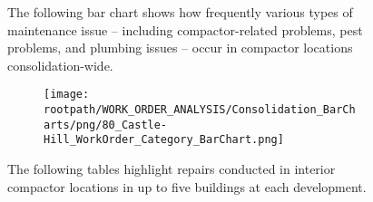 \begin{figure}[h]
                                \sf
                                The following bar chart shows how frequently various types of maintenance issue -- including compactor-related problems, pest problems, and plumbing issues -- occur in compactor locations consolidation-wide.
                                \raggedright
                                \begin{subfigure}{\textwidth}
                                \texttt{[image: \\rootpath/WORK\_ORDER\_ANALYSIS/Consolidation\_BarCharts/png/80\_Castle-Hill\_WorkOrder\_Category\_BarChart.png]}
                                \end{subfigure}
                                \end{figure}
\begin{figure}[h]
                                \raggedright
                                \sf
                                The following tables highlight repairs conducted in interior compactor locations in up to five buildings at each development.\\
                                
\end{figure}
